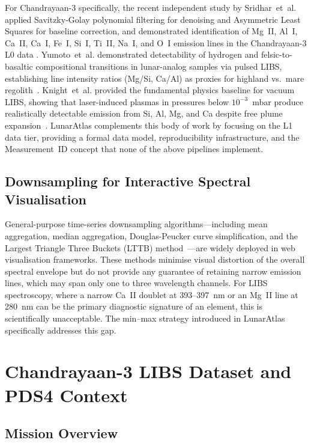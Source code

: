 \documentclass[a4paper,twocolumn,10pt]{article}
\begin{document}
For Chandrayaan-3 specifically, the recent independent study by
Sridhar~et~al. applied Savitzky-Golay polynomial filtering for
denoising and Asymmetric Least Squares for baseline correction, and
demonstrated identification of Mg~II, Al~I, Ca~II, Ca~I, Fe~I, Si~I,
Ti~II, Na~I, and O~I emission lines in the Chandrayaan-3 L0 data
\cite{Sridhar2025}.  Yumoto~et~al. demonstrated detectability of
hydrogen and felsic-to-basaltic compositional transitions in
lunar-analog samples via pulsed LIBS, establishing line intensity
ratios (Mg/Si, Ca/Al) as proxies for highland vs.\ mare
regolith~\cite{Yumoto2023}.  Knight~et~al. provided the
fundamental physics baseline for vacuum LIBS, showing that
laser-induced plasmas in pressures below $10^{-3}$~mbar produce
realistically detectable emission from Si, Al, Mg, and Ca despite
free plume expansion~\cite{Knight2000}.
LunarAtlas complements this body of work by focusing on
the L1 data tier, providing a formal data model, reproducibility
infrastructure, and the Measurement~ID concept that none of the
above pipelines implement.

\subsection{Downsampling for Interactive Spectral Visualisation}

General-purpose time-series downsampling algorithms---including mean
aggregation, median aggregation, Douglas-Peucker curve simplification,
and the Largest Triangle Three Buckets (LTTB) method~\cite{
Steinarsson2013}---are widely deployed in web visualisation frameworks.
These methods minimise visual distortion of the overall spectral
envelope but do not provide any guarantee of retaining narrow emission
lines, which may span only one to three wavelength channels.  For LIBS
spectroscopy, where a narrow Ca~II doublet at 393--397~nm or an Mg~II
line at 280~nm can be the primary diagnostic signature of an element,
this is scientifically unacceptable.  The min--max strategy introduced
in LunarAtlas specifically addresses this gap.


\section{Chandrayaan-3 LIBS Dataset and PDS4 Context}
\label{sec:data}

\subsection{Mission Overview}
\end{document}
